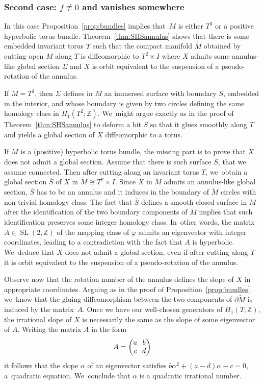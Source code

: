 \documentclass[11pt]{article}
\DeclareMathOperator{\SL}{SL}
\theoremstyle{definition}
\begin{document}
\subsubsection*{Second case: $f\not \equiv 0$ and vanishes somewhere}
In this case Proposition~\ref{prop:bundles} implies that~$M$ is either $T^3$ or a positive hyperbolic torus bundle. Theorem~\ref{thm:SHSannulus} shows that there is some embedded invariant torus $T$ such that the compact manifold $\widetilde M$ obtained by cutting open $M$ along $T$ is diffeomorphic to $T^2\times I$ where $X$ admits some annulus-like global section $\Sigma$ and $X$ is orbit equivalent to the suspension of a pseudo-rotation of the annulus.

If $M=T^3$, then $\Sigma$ defines in $M$ an immersed surface with boundary $S$, embedded in the interior, and whose boundary is given by two circles defining the same homology class in $H_1(T^2;\mathbb{Z})$. We~might argue exactly as in the proof of Theorem~\ref{thm:SHSannulus} to deform a bit $S$ so that it glues smoothly along $T$ and yields a global section of $X$ diffeomorphic to a torus.

If $M$ is a (positive) hyperbolic torus bundle, the missing part is to prove that $X$ does not admit a global section. Assume that there is such surface $S$, that we assume connected. Then after cutting along an invariant torus $T$, we~obtain a global section $\overline S$ of $X$ in $\widetilde M \cong T^2\times I$. Since $X$ in $\widetilde{M}$ admits an annulus-like global section, $\overline{S}$ has to be an annulus and it induces in the boundary of $\widetilde M$ circles with non-trivial homology class.
The fact that $\overline S$ defines a smooth closed surface in $M$ after the identification of the two boundary components of $\widetilde M$ implies that such identification preserves some integer homology class. In~other words, the matrix $A\in \SL(2,\mathbb{Z})$ of the mapping class of $\varphi$ admits an eigenvector with integer coordinates, leading to a contradiction with the fact that $A$ is hyperbolic. We~deduce that $X$ does not admit a global section, even if after cutting along $T$ it is orbit equivalent to the suspension of a pseudo-rotation of the annulus.

Observe now that the rotation number of the annulus defines the slope of $X$ in appropriate coordinates. Arguing as in the proof of Proposition~\ref{prop:bundles}, we~know that the gluing diffeomorphism between the two components of $\partial \widetilde M$ is induced by the matrix~$A$. Once we have our well-chosen generators of $H_1(T;\mathbb{Z})$, the irrational slope of $X$ is necessarily the same as the slope of some eigenvector of $A$. Writing the matrix $A$ in the form
\begin{equation*}\arraycolsep3.5pt
A=\begin{pmatrix}
a & b \\
c & d
\end{pmatrix}
\end{equation*}
it follows that the slope $\alpha$ of an eigenvector satisfies $b\alpha^2+(a-d)\alpha-c=0$, a~quadratic equation. We~conclude that $\alpha$ is a quadratic irrational number.
\end{document}
